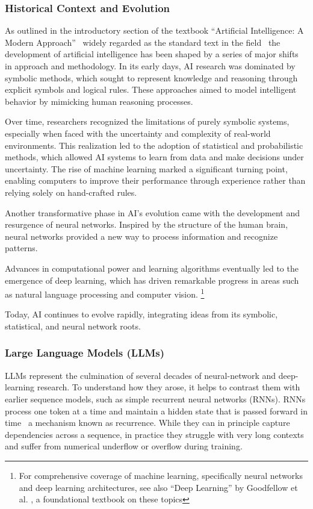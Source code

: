 \subsubsection{Historical Context and Evolution}
As outlined in the introductory section of the textbook \enquote{Artificial Intelligence: A Modern Approach} \cite{ai-modern-approach} \textemdash\ widely regarded as the standard text in the field \textemdash\ the development of artificial intelligence has been shaped by a series of major shifts in approach and methodology. 
In its early days, AI research was dominated by symbolic methods, which sought to represent knowledge and reasoning through explicit symbols and logical rules. 
These approaches aimed to model intelligent behavior by mimicking human reasoning processes.

Over time, researchers recognized the limitations of purely symbolic systems, especially when faced with the uncertainty and complexity of real-world environments. 
This realization led to the adoption of statistical and probabilistic methods, which allowed AI systems to learn from data and make decisions under uncertainty. 
The rise of machine learning marked a significant turning point, enabling computers to improve their performance through experience rather than relying solely on hand-crafted rules.

Another transformative phase in AI's evolution came with the development and resurgence of neural networks. 
Inspired by the structure of the human brain, neural networks provided a new way to process information and recognize patterns.

Advances in computational power and learning algorithms eventually led to the emergence of deep learning, which has driven remarkable progress in areas such as natural language processing and computer vision.%
\footnote{For comprehensive coverage of machine learning, specifically neural networks and deep learning architectures, see also \enquote{Deep Learning} by Goodfellow et al. \cite{deeplearning-book}, a foundational textbook on these topics}

Today, AI continues to evolve rapidly, integrating ideas from its symbolic, statistical, and neural network roots. 

\def\sectitle{Large Language Models}
\subsubsection%
[\sectitle]{\sectitle{} (LLMs) \cite{ai-modern-approach}}
LLMs represent the culmination of several decades of neural-network and deep-learning research.
To understand how they arose, it helps to contrast them with earlier sequence models, such as simple recurrent neural networks (RNNs).
RNNs process one token at a time and maintain a hidden state that is passed forward in time \textemdash\ a mechanism known as recurrence.
While they can in principle capture dependencies across a sequence, in practice they struggle with very long contexts and suffer from numerical underflow or overflow during training.

